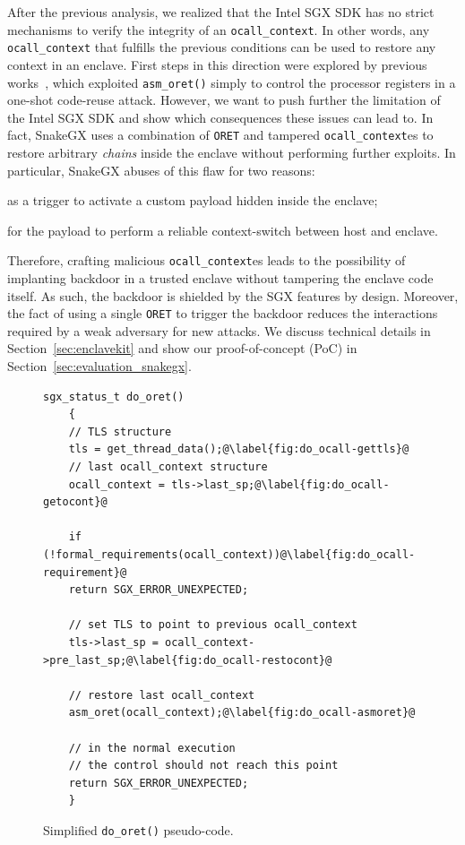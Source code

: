 After the previous analysis, we realized that the Intel SGX SDK has no strict
mechanisms to verify the integrity of an \texttt{ocall\_context}.
In other words, any \texttt{ocall\_context} that fulfills
the previous conditions can be used to restore any context in an enclave.
First steps in this direction were explored by previous 
works~\citep{biondo2018guard}, which exploited \texttt{asm\_oret()} simply to 
control the processor registers in a one-shot code-reuse attack.
However, we want to push further the limitation of the Intel SGX SDK and show 
which consequences these issues can lead to.
In fact, SnakeGX uses a combination of \texttt{ORET} and tampered 
\texttt{ocall\_context}es to restore arbitrary \emph{chains}
inside the enclave without performing further exploits.
In particular, SnakeGX abuses of this flaw for two reasons:
\begin{enumerate*}[label=(\roman*)]
	\item as a trigger to activate a custom payload hidden inside the 
	enclave;
	\item for the payload to perform a reliable context-switch between host and 
	enclave.
\end{enumerate*}
Therefore, crafting malicious \texttt{ocall\_context}es leads to the 
possibility of implanting backdoor in a trusted enclave without tampering the 
enclave code itself.
As such, the backdoor is shielded by the SGX features by design.
Moreover, the fact of using a single \texttt{ORET} to trigger the backdoor 
reduces the interactions required by a weak adversary for new attacks.
We discuss technical details in Section~\ref{sec:enclavekit} and show our 
proof-of-concept (PoC) in Section~\ref{sec:evaluation_snakegx}.

\begin{figure}[t]	
	\begin{lstlisting}[style=CStyle,escapechar=@]
	sgx_status_t do_oret()
	{
	// TLS structure
	tls = get_thread_data();@\label{fig:do_ocall-gettls}@
	// last ocall_context structure
	ocall_context = tls->last_sp;@\label{fig:do_ocall-getocont}@
	
	if (!formal_requirements(ocall_context))@\label{fig:do_ocall-requirement}@
	return SGX_ERROR_UNEXPECTED;
	
	// set TLS to point to previous ocall_context
	tls->last_sp = ocall_context->pre_last_sp;@\label{fig:do_ocall-restocont}@
	
	// restore last ocall_context
	asm_oret(ocall_context);@\label{fig:do_ocall-asmoret}@
	
	// in the normal execution
	// the control should not reach this point
	return SGX_ERROR_UNEXPECTED;
	}
	\end{lstlisting}
	\caption{Simplified \texttt{do\_oret()} pseudo-code.}
	\label{fig:do_ocall}
\end{figure}

